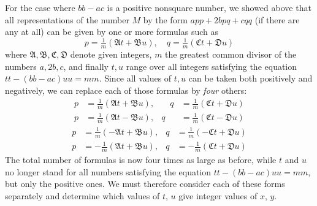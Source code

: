 For the case where $bb-ac$ is a positive nonsquare number, we showed above that all representations of the number $M$ by the form $app+2bpq+cqq$ (if there are any at all) can be given by one or more formulas such as
\[
p=\tfrac{1}{m}(\mathfrak{A}t+\mathfrak{B}u),\quad q=\tfrac{1}{m}(\mathfrak{C}t+\mathfrak{D}u)
\]
where $\mathfrak{A},\mathfrak{B},\mathfrak{C},\mathfrak{D}$ denote given integers, $m$ the greatest common divisor of the numbers $a,2b,c$, and finally $t,u$ range over all integers satisfying the equation $tt-(bb-ac)uu=mm$. Since all values of $t,u$ can be taken both positively and negatively, we can replace each of those formulas by \textit{four} others:
\[
\begin{aligned}
p&=\tfrac{1}{m}(\mathfrak{A}t+\mathfrak{B}u), &\quad q&=\tfrac{1}{m}(\mathfrak{C}t+\mathfrak{D}u)\\
p&=\tfrac{1}{m}(\mathfrak{A}t-\mathfrak{B}u), &q&=\tfrac{1}{m}(\mathfrak{C}t-\mathfrak{D}u)
\end{aligned}
\]
\[
\begin{aligned}
p&=\tfrac{1}{m}(-\mathfrak{A}t+\mathfrak{B}u),&
q&=\tfrac{1}{m}(-\mathfrak{C}t+\mathfrak{D}u)\\
p&=-\tfrac{1}{m}(\mathfrak{A}t+\mathfrak{B}u),&
q&=-\tfrac{1}{m}(\mathfrak{C}t+\mathfrak{D}u)
\end{aligned}
\]
The total number of formulas is now four times as large as before, while $t$ and $u$ no longer stand for all numbers satisfying the equation $tt-(bb-ac)uu=mm$, but only the positive ones. We must therefore consider each of these forms separately and determine which values of $t$, $u$ give integer values of $x$, $y$.

